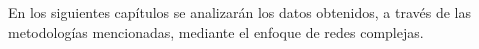 En los siguientes capítulos se analizarán los datos obtenidos, a través de las metodologías mencionadas, mediante el enfoque de redes complejas.
 
 
 
 
 
 
 
 
 


